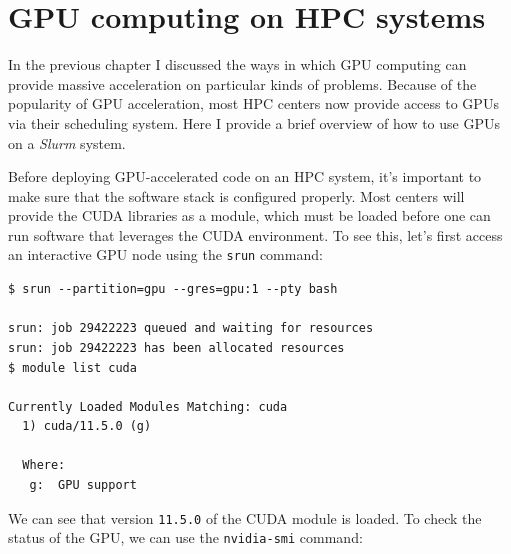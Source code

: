 \section{GPU computing on HPC systems}

In the previous chapter I discussed the ways in which GPU computing can provide massive acceleration on particular kinds of problems.  Because of the popularity of GPU acceleration, most HPC centers now provide access to GPUs via their scheduling system.  Here I provide a brief overview of how to use GPUs on a \textit{Slurm} system.

Before deploying GPU-accelerated code on an HPC system, it's important to make sure that the software stack is configured properly.  Most centers will provide the CUDA libraries as a module, which must be loaded before one can run software that leverages the CUDA environment. To see this, let's first access an interactive GPU node using the \texttt{srun} command:

\begin{lstlisting}[style=shell]
$ srun --partition=gpu --gres=gpu:1 --pty bash

srun: job 29422223 queued and waiting for resources
srun: job 29422223 has been allocated resources
$ module list cuda

Currently Loaded Modules Matching: cuda
  1) cuda/11.5.0 (g)

  Where:
   g:  GPU support
\end{lstlisting}

We can see that version \texttt{11.5.0} of the CUDA module is loaded.  To check the status of the GPU, we can use the \texttt{nvidia-smi} command:

